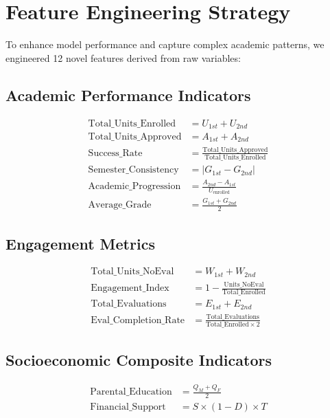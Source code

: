 \section{Feature Engineering Strategy}

To enhance model performance and capture complex academic patterns, we engineered 12 novel features derived from raw variables:

\subsection{Academic Performance Indicators}

\begin{align}
\text{Total\_Units\_Enrolled} &= U_{1st} + U_{2nd} \\
\text{Total\_Units\_Approved} &= A_{1st} + A_{2nd} \\
\text{Success\_Rate} &= \frac{\text{Total\_Units\_Approved}}{\text{Total\_Units\_Enrolled}} \\
\text{Semester\_Consistency} &= |G_{1st} - G_{2nd}| \\
\text{Academic\_Progression} &= \frac{A_{2nd} - A_{1st}}{U_{\text{enrolled}}} \\
\text{Average\_Grade} &= \frac{G_{1st} + G_{2nd}}{2}
\end{align}

\subsection{Engagement Metrics}

\begin{align}
\text{Total\_Units\_NoEval} &= W_{1st} + W_{2nd} \\
\text{Engagement\_Index} &= 1 - \frac{\text{Units\_NoEval}}{\text{Total\_Enrolled}} \\
\text{Total\_Evaluations} &= E_{1st} + E_{2nd} \\
\text{Eval\_Completion\_Rate} &= \frac{\text{Total\_Evaluations}}{\text{Total\_Enrolled} \times 2}
\end{align}

\subsection{Socioeconomic Composite Indicators}

\begin{align}
\text{Parental\_Education} &= \frac{Q_M + Q_F}{2} \\
\text{Financial\_Support} &= S \times (1 - D) \times T
\end{align}

